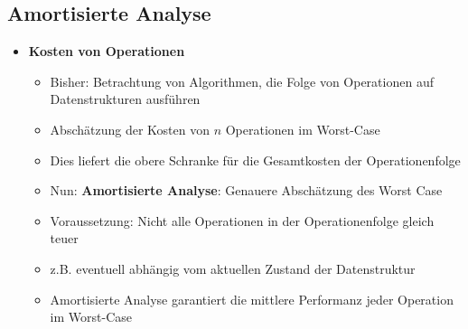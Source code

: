 \subsection{Amortisierte Analyse}
    \begin{itemize}
        \item \textbf{Kosten von Operationen}
            \begin{itemize}
                \item Bisher: Betrachtung von Algorithmen, die Folge von Operationen auf Datenstrukturen ausführen
                \item Abschätzung der Kosten von $n$ Operationen im Worst-Case
                \item Dies liefert die obere Schranke für die Gesamtkosten der Operationenfolge
                \item Nun: \textbf{Amortisierte Analyse}: Genauere Abschätzung des Worst Case
                \item Voraussetzung: Nicht alle Operationen in der Operationenfolge gleich teuer
                \item z.B. eventuell abhängig vom aktuellen Zustand der Datenstruktur
                \item Amortisierte Analyse garantiert die mittlere Performanz jeder Operation im Worst-Case
            \end{itemize}


\end{itemize}
